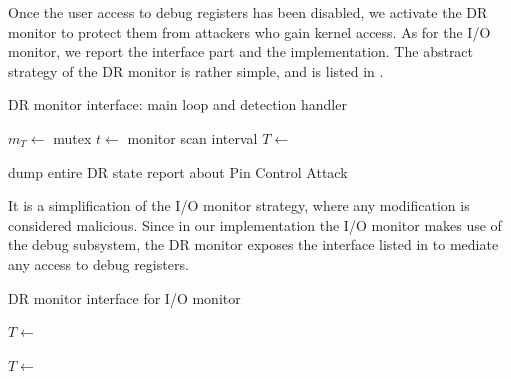 Once the user access to debug registers has been disabled, we activate the DR monitor to protect them from attackers who gain kernel access.
As for the I/O monitor, we report the interface part and the implementation.
The abstract strategy of the DR monitor is rather simple, and is listed in .
\begin{algorithm}[h]
\caption{DR monitor interface: main loop and detection handler}
\label{alg:dr_iface}
\begin{algorithmic}[1]
	\State $m_T \gets$ mutex 
	\State $t \gets$ monitor scan interval 
	\State $T \gets$  
	\Loop
		\State {}
		\State {} 
		\State {}
			\State \Return {}
		\EndIf
		\State {} 
	\EndLoop
\EndFunction
\Statex
\end{algorithmic}

\begin{algorithmic}[1]
 
		\State dump entire DR state
	\EndIf
	\State report about Pin Control Attack
		\State {} 
	\EndIf
\EndFunction
\end{algorithmic}
\end{algorithm}
It is a simplification of the I/O monitor strategy, where any modification is considered malicious.
Since in our implementation the I/O monitor makes use of the debug subsystem, the DR monitor exposes the interface listed in 
to mediate any access to debug registers.
\begin{algorithm}[h]
\caption{DR monitor interface for I/O monitor}
\label{alg:dr_ioiface}
\begin{algorithmic}[1]
 
	\State {}
	\State {} 
	\State $T \gets$  
	\State {}
\EndFunction
\Statex
\end{algorithmic}

\begin{algorithmic}[1]
 
	\State {}
	\State {} 
	\State $T \gets$  
	\State {}
\EndFunction
\end{algorithmic}
\end{algorithm}
